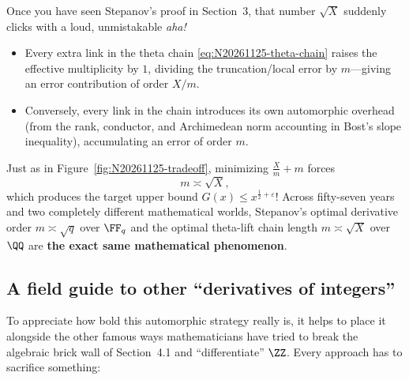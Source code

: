 Once you have seen Stepanov's proof in Section~3, that number \(\sqrt{X}\) suddenly clicks with a loud, unmistakable \emph{aha!}
\begin{itemize}\setlength{\itemsep}{3pt}\setlength{\parsep}{0pt}
  \item Every extra link in the theta chain \eqref{eq:N20261125-theta-chain} raises the effective multiplicity by \(1\), dividing the truncation/local error by \(m\)---giving an error contribution of order \(X / m\).
  \item Conversely, every link in the chain introduces its own automorphic overhead (from the rank, conductor, and Archimedean norm accounting in Bost's slope inequality), accumulating an error of order \(m\).
\end{itemize}
Just as in Figure~\ref{fig:N20261125-tradeoff}, minimizing \(\frac{X}{m} + m\) forces
\[
  m \asymp \sqrt{X},
\]
which produces the target upper bound \(G(x) \le x^{\frac{1}{2}+\varepsilon}\)! Across fifty-seven years and two completely different mathematical worlds, Stepanov's optimal derivative order \(m \asymp \sqrt{q}\) over \(\FF_q\) and the optimal theta-lift chain length \(m \asymp \sqrt{X}\) over \(\QQ\) are \textbf{the exact same mathematical phenomenon}.

\enlargethispage{1.5\baselineskip}
\subsection{A field guide to other ``derivatives of integers''}

To appreciate how bold this automorphic strategy really is, it helps to place it alongside the other famous ways mathematicians have tried to break the algebraic brick wall of Section~4.1 and ``differentiate'' \(\ZZ\). Every approach has to sacrifice something:

